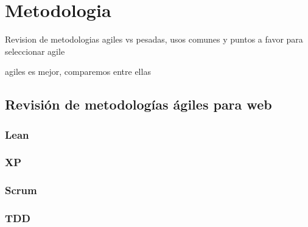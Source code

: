 \section{Metodologia}

Revision de metodologias agiles vs pesadas, usos comunes y puntos a favor para seleccionar agile

agiles es mejor, comparemos entre ellas
\cite{ComparacionFrameworks}
\subsection{Revisión de metodologías ágiles para web }

    \subsubsection{Lean}
    \subsubsection{XP}
    \subsubsection{Scrum}
    \subsubsection{TDD}